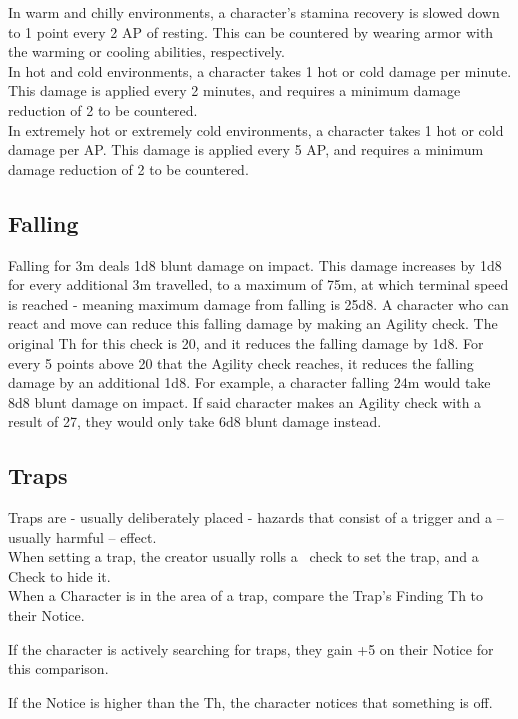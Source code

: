 In warm and chilly environments, a character's stamina recovery is slowed down to 1 point every 2 AP of resting.
This can be countered by wearing armor with the warming or cooling abilities, respectively.\\

In hot and cold environments, a character takes 1 hot or cold damage per minute.
This damage is applied every 2 minutes, and requires a minimum damage reduction of 2 to be countered.\\

In extremely hot or extremely cold environments, a character takes 1 hot or cold damage per AP.
This damage is applied every 5 AP, and requires a minimum damage reduction of 2 to be countered.\\

\subsection{Falling}\label{subsec:falling}
Falling for 3m deals 1d8 blunt damage on impact.
This damage increases by 1d8 for every additional 3m travelled, to a maximum of 75m, at which terminal speed is reached - meaning maximum damage from falling is 25d8.
A character who can react and move can reduce this falling damage by making an Agility check.
The original Th for this check is 20, and it reduces the falling damage by 1d8.
For every 5 points above 20 that the Agility check reaches, it reduces the falling damage by an additional 1d8.
For example, a character falling 24m would take 8d8 blunt damage on impact.
If said character makes an Agility check with a result of 27, they would only take 6d8 blunt damage instead.

\subsection{Traps}\label{subsec:traps}
Traps are - usually deliberately placed - hazards that consist of a trigger and a -- usually harmful -- effect.\\
When setting a trap, the creator usually rolls a~ check to set the trap, and a~ Check to hide it.\\
When a Character is in the area of a trap, compare the Trap's Finding Th to their Notice.

If the character is actively searching for traps, they gain +5 on their Notice for this comparison.

If the Notice is higher than the Th, the character notices that something is off.

